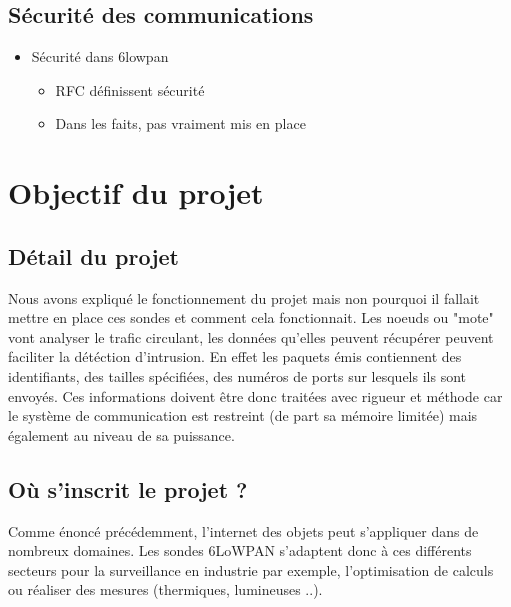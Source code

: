 	\subsection{Sécurité des communications}
		\begin{itemize}
			\item Sécurité dans 6lowpan
			\begin{itemize}
				\item RFC définissent sécurité
				\item Dans les faits, pas vraiment mis en place
			\end{itemize}
		\end{itemize}



\section{Objectif du projet}

	\subsection{Détail du projet}
		Nous avons expliqué le fonctionnement du projet mais non pourquoi il fallait mettre en place ces sondes et comment cela fonctionnait. Les noeuds ou "mote" vont analyser le trafic circulant, les données qu'elles peuvent récupérer peuvent faciliter la détéction d'intrusion. En effet les paquets émis contiennent des identifiants, des tailles spécifiées, des numéros de ports sur lesquels ils sont envoyés. Ces informations doivent être donc traitées avec rigueur et méthode car le système de communication est restreint (de part sa mémoire limitée) mais également au niveau de sa puissance.
	\subsection{Où s'inscrit le projet ?}
			Comme énoncé précédemment, l'internet des objets peut s'appliquer dans de nombreux domaines. Les sondes 6LoWPAN s'adaptent donc à ces différents secteurs pour la surveillance en industrie par exemple, l'optimisation de calculs ou réaliser des mesures (thermiques, lumineuses ..). 

